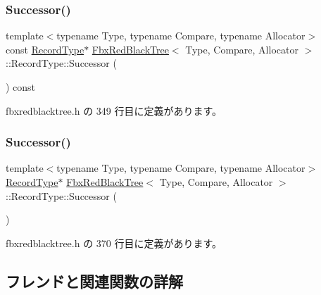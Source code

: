 \subsubsection{\texorpdfstring{Successor()}{Successor()}\hspace{0.1cm}{\footnotesize\ttfamily [1/2]}}
{\footnotesize\ttfamily template$<$typename Type, typename Compare, typename Allocator$>$ \\
const \hyperlink{class_fbx_red_black_tree_1_1_record_type}{Record\+Type}$\ast$ \hyperlink{class_fbx_red_black_tree}{Fbx\+Red\+Black\+Tree}$<$ Type, Compare, Allocator $>$\+::Record\+Type\+::\+Successor (\begin{DoxyParamCaption}{ }\end{DoxyParamCaption}) const\hspace{0.3cm}{\ttfamily [inline]}}



 fbxredblacktree.\+h の 349 行目に定義があります。

\mbox{\label{class_fbx_red_black_tree_1_1_record_type_a0af352fc345ec4bfe86ba8c0c79bb337}} 
\subsubsection{\texorpdfstring{Successor()}{Successor()}\hspace{0.1cm}{\footnotesize\ttfamily [2/2]}}
{\footnotesize\ttfamily template$<$typename Type, typename Compare, typename Allocator$>$ \\
\hyperlink{class_fbx_red_black_tree_1_1_record_type}{Record\+Type}$\ast$ \hyperlink{class_fbx_red_black_tree}{Fbx\+Red\+Black\+Tree}$<$ Type, Compare, Allocator $>$\+::Record\+Type\+::\+Successor (\begin{DoxyParamCaption}{ }\end{DoxyParamCaption})\hspace{0.3cm}{\ttfamily [inline]}}



 fbxredblacktree.\+h の 370 行目に定義があります。



\subsection{フレンドと関連関数の詳解}
\mbox{\label{class_fbx_red_black_tree_1_1_record_type_ad58e9ce88250221aa6b5145e8ccc237f}} 
